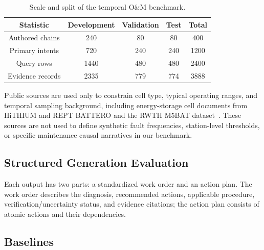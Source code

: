 \begin{table}[t]
\caption{Scale and split of the temporal O\&M benchmark.}
\label{tab:dataset_stats}
\centering
\small
\begin{tabular}{ccccc}
\toprule
Statistic & Development & Validation & Test & Total \\
\midrule
Authored chains & 240 & 80 & 80 & 400 \\
Primary intents & 720 & 240 & 240 & 1200 \\
Query rows & 1440 & 480 & 480 & 2400 \\
Evidence records & 2335 & 779 & 774 & 3888 \\
\bottomrule
\end{tabular}
\end{table}

Public sources are used only to constrain cell type, typical operating ranges, and temporal sampling background, including energy-storage cell documents from HiTHIUM and REPT BATTERO and the RWTH M5BAT dataset~\cite{hithium2023v11,hithium2024v33,rept2025,rwth2026m5bat}. These sources are not used to define synthetic fault frequencies, station-level thresholds, or specific maintenance causal narratives in our benchmark.

\subsection{Structured Generation Evaluation}


 Each output has two parts: a standardized work order and an action plan. The work order describes the diagnosis, recommended actions, applicable procedure, verification/uncertainty status, and evidence citations; the action plan consists of atomic actions and their dependencies.

\subsection{Baselines}
\label{sec:baselines}

